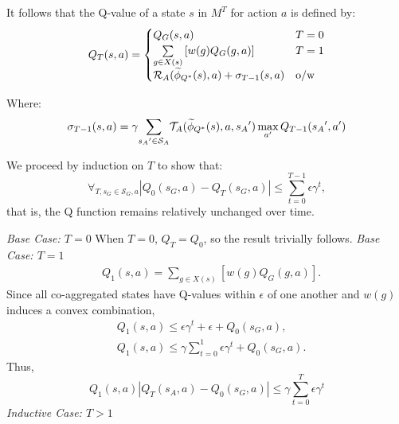 It follows that the Q-value of a state $s$ in $M^T$ for action $a$ is defined by:
\begin{equation}
Q_T(s, a) = 
\begin{cases}
	   Q_G(s, a) &  T=0\\
	   \underset{g \in X(s)}{\sum} \left[ w(g)Q_G(g,a) \right] & T = 1\\
	   \mathcal{R}_A(\widetilde \phi_{Q^*}(s),a) + \sigma_{T-1}(s,a) &\text{o/w}

\end{cases}
\end{equation}

Where:
\begin{equation}
\sigma_{T-1}(s,a) = \gamma \underset{{s_A}' \in \mathcal{S}_A}{\sum} \mathcal{T}_A(\widetilde \phi_{Q^*}(s),a,{s_A}') \max_{a'} Q_{T-1}({s_A}', a')
\end{equation}

We proceed by induction on $T$ to show that:
\begin{equation}
\forall_{T, s_G \in \mathcal{S}_G, a} |Q_0(s_G, a) - Q_T(s_G, a)| \leq \sum_{t=0}^{T-1} \epsilon \gamma^{t},
\end{equation}
that is, the Q function remains relatively unchanged over time.

\textit{Base Case: $T = 0$}
When $T = 0$, $Q_T = Q_0$, so the result trivially follows.
\textit{Base Case: $T = 1$}
\begin{align*}
&Q_1(s,a) = \underset{g \in X(s)}{\sum} \left[ w(g)Q_G(g,a) \right].
\end{align*}
Since all co-aggregated states have Q-values within $\epsilon$ of one another and $w(g)$ induces a convex combination,
\begin{align*}
&Q_1(s,a) \leq \epsilon \gamma^t + \epsilon + Q_0(s_G, a),\\
&Q_1(s,a) \leq \gamma\sum_{t=0}^{1} \epsilon \gamma^t + Q_0(s_G, a).
\end{align*}
Thus,
\begin{equation}
Q_1(s,a) \left| Q_{T}(s_A, a) - Q_0(s_G,a) \right| \leq \gamma\sum_{t=0}^{T}\epsilon \gamma^t
\end{equation}
\textit{Inductive Case: $T > 1$}

